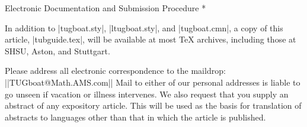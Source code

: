 \head * Electronic Documentation and Submission Procedure *

In addition to |tugboat.sty|, |ltugboat.sty|, and |tugboat.cmn|,
a copy of this article, |tubguide.tex|, will be available at
most \TeX{} archives, including those at SHSU, Aston, and Stuttgart.

Please address all electronic correspondence to the \TUB{} maildrop:
||TUGboat@Math.AMS.com||
Mail to either of our personal addresses is liable to go unseen if
vacation or illness intervenes.  We also request that you supply
an abstract of any expository article.  This will be used as the
basis for translation of abstracts to languages other than that
in which the article is published.


\makesignature

\endarticle
